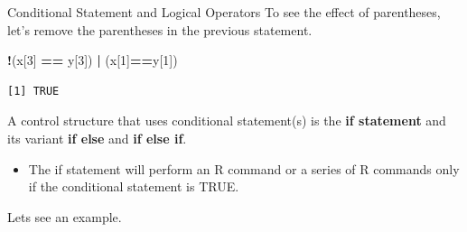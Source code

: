 \documentclass[
  ignorenonframetext,
]{beamer}
\newenvironment{Shaded}{\begin{snugshade}}{\end{snugshade}}
\newcommand{\DecValTok}[1]{\textcolor[rgb]{0.00,0.00,0.81}{#1}}
\newcommand{\NormalTok}[1]{#1}
\newcommand{\SpecialCharTok}[1]{\textcolor[rgb]{0.81,0.36,0.00}{\textbf{#1}}}
\providecommand{\tightlist}{%
  \setlength{\itemsep}{0pt}\setlength{\parskip}{0pt}}
\begin{document}
\begin{frame}[fragile]{Conditional Statement and Logical Operators}
\label{conditional-statement-and-logical-operators-2}
To see the effect of parentheses, let's remove the parentheses in the
previous statement. \small

\begin{Shaded}
\begin{Highlighting}[]
\SpecialCharTok{!}\NormalTok{(x[}\DecValTok{3}\NormalTok{] }\SpecialCharTok{==}\NormalTok{ y[}\DecValTok{3}\NormalTok{]) }\SpecialCharTok{|}\NormalTok{ (x[}\DecValTok{1}\NormalTok{]}\SpecialCharTok{==}\NormalTok{y[}\DecValTok{1}\NormalTok{])}
\end{Highlighting}
\end{Shaded}

\begin{verbatim}
[1] TRUE
\end{verbatim}

\normalsize

A control structure that uses conditional statement(s) is the \textbf{if
statement} and its variant \textbf{if else} and \textbf{if else if}.

\begin{itemize}
\tightlist
\item
  The if statement will perform an R command or a series of R commands
  only if the conditional statement is TRUE.
\end{itemize}

Lets see an example.
\end{frame}
\end{document}
